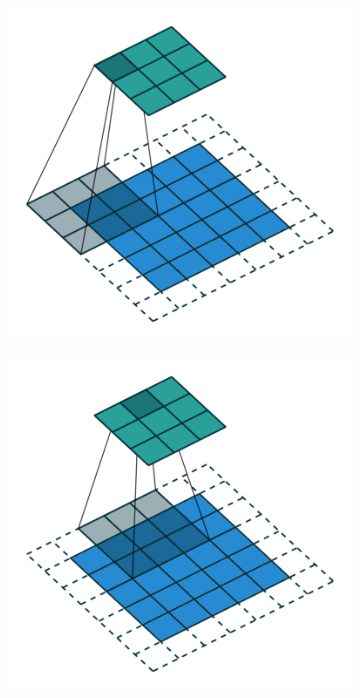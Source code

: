 \begin{figure}[h!]
  \begin{subfigure}[b]{0.32\textwidth}
    \includegraphics[width=\textwidth]{figures/padding_strides_00}
  \end{subfigure}
  \begin{subfigure}[b]{0.32\textwidth}
    \includegraphics[width=\textwidth]{figures/padding_strides_01}

\end{subfigure}
\end{figure}
